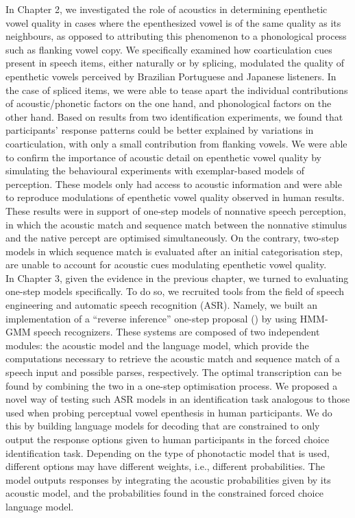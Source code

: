 In Chapter 2, we investigated the role of acoustics in determining epenthetic vowel quality in cases where the epenthesized vowel is of the same quality as its neighbours, as opposed to attributing this phenomenon to a phonological process such as flanking vowel copy. We specifically examined how coarticulation cues present in speech items, either naturally or by splicing, modulated the quality of epenthetic vowels perceived by Brazilian Portuguese and Japanese listeners. In the case of spliced items, we were able to tease apart the individual contributions of acoustic/phonetic factors on the one hand, and phonological factors on the other hand. Based on results from two identification experiments, we found that participants' response patterns could be better explained by variations in coarticulation, with only a small contribution from flanking vowels. We were able to confirm the importance of acoustic detail on epenthetic vowel quality by simulating the behavioural experiments with exemplar-based models of perception. These models only had access to acoustic information and were able to reproduce modulations of epenthetic vowel quality observed in human results. These results were in support of one-step models of nonnative speech perception, in which the acoustic match and sequence match between the nonnative stimulus and the native percept are optimised simultaneously. On the contrary, two-step models in which sequence match is evaluated after an initial categorisation step, are unable to account for acoustic cues modulating epenthetic vowel quality.    \\


In Chapter 3, given the evidence in the previous chapter, we turned to evaluating one-step models specifically. To do so, we recruited tools from the field of speech engineering and automatic speech recognition (ASR). Namely, we built an implementation of a ``reverse inference'' one-step proposal (\cite{wilson2013}) by using HMM-GMM speech recognizers. These systems are composed of two independent modules: the acoustic model and the language model, which provide the computations necessary to retrieve the acoustic match and sequence match of a speech input and possible parses, respectively. The optimal transcription can be found by combining the two in a one-step optimisation process.
We proposed a novel way of testing such ASR models in an identification task analogous to those used when probing perceptual vowel epenthesis in human participants. We do this by building language models for decoding that are constrained to only output the response options given to human participants in the forced choice identification task. Depending on the type of phonotactic model that is used, different options may have different weights, i.e., different probabilities. The model outputs responses by integrating the acoustic probabilities given by its acoustic model, and the probabilities found in the constrained forced choice language model.

